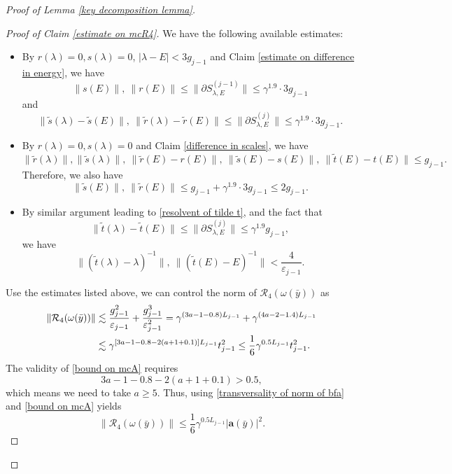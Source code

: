 \documentclass[10pt,a4paper]{amsart}
\newcommand{\bfa}{\mathbf{a}}
\newcommand{\mcR}{\mathcal{R}}
\newcommand{\partialSjminusone}{\partial {S}^{(j-1)}}
\newcommand{\partialSj}{\partial {S}^{(j)}}
\newcommand{\tr}{\tilde{r}}
\newcommand{\ts}{\tilde{s}}
\renewcommand{\tt}{\tilde{t}}
\begin{document}
\begin{proof}[Proof of Lemma \ref{key decomposition lemma}]
\begin{proof}[Proof of Claim \ref{estimate on mcR4}]
We have the following  available estimates:
\begin{itemize} 
 \item By $r(\lambda)=0,s(\lambda)=0$, $|\lambda-E|<3g_{j-1}$ and Claim \ref{estimate on difference in energy}, we have 
             \[\| s(E) \|,\ \| r(E)\| \leq \| \partialSjminusone_{\lambda,E}\|\leq \gamma^{1.9} \cdot 3g_{j-1} \]
             and 
           \[\| \ts(\lambda)-\ts(E) \|,\ \| \tr(\lambda)-\tr(E)\| \leq \| \partialSj_{\lambda,E}\|\leq \gamma^{1.9} \cdot 3g_{j-1} .\]
  \item By $r(\lambda)=0,s(\lambda)=0$ and Claim \ref{difference in scales}, we have 
               \[\|\tr(\lambda)\|, \|\ts(\lambda)\|,\   \| \tr(E)-r(E)\|, \ \| \ts(E)-s(E) \|,\  \|\tt(E)-t(E)\| \leq g_{j-1}.\] 
       Therefore, we also have 
       \[  \| \ts(E) \|,\ \| \tr(E)\| \leq g_{j-1}+ \gamma^{1.9} \cdot 3g_{j-1}\leq 2 g_{j-1}.   \]
  \item By similar argument leading  to \eqref{resolvent of tilde t}, and the fact that 
      \[ \| \tt(\lambda)-\tt(E)\| \leq \| \partialSj_{\lambda,E}\|\leq \gamma^{1.9} g_{j-1},\]
        we have  
        \[\|(\tt(\lambda)-\lambda)^{-1} \|, \ \|(\tt(E)-E)^{-1} \| <\frac{4}{\varepsilon_{j-1}}. \]
\end{itemize}
Use the estimates listed above, we can control  the norm of $\mcR_4(\omega(\bar{y}))$ as 
\begin{align}\label{bound on mcA}
  \notag \|\mcR_4(\omega(\bar{y}))\| &\lesssim \frac{g_{j-1}^2 }{\varepsilon_{j-1}} + \frac{g_{j-1}^3 }{\varepsilon_{j-1}^2} = \gamma^{(3a-1-0.8)L_{j-1}} +\gamma^{(4a-2-1.4)L_{j-1}}\\
    &\lesssim \gamma^{[3a-1-0.8-2(a+1+0.1)]L_{j-1}}t^2_{j-1} \leq \frac{1}{6}\gamma^{0.5L_{j-1}} t^2_{j-1}.
\end{align}
The validity of \eqref{bound on mcA} requires 
\begin{equation}\label{range of a}
  3a-1-0.8-2(a+1+0.1)>0.5,
\end{equation}
which means we need to take $a\geq 5$. Thus, using \eqref{transversality of norm of bfa} and \eqref{bound on mcA} yields 
\[\| \mcR_4(\omega(\bar{y})) \|\leq \frac{1}{6}\gamma^{0.5L_{j-1}} |\bfa(\bar{y}) |^2 .\]

\end{proof}




\end{proof}
\end{document}
